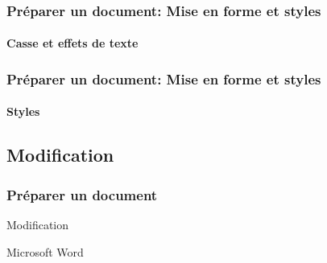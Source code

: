 \documentclass[xcolor=table]{beamer}
\begin{document}
\begin{frame}
\frametitle{Préparer un document: Mise en forme et styles}
\framesubtitle{Casse et effets de texte}

\begin{minipage}{0.58\textwidth}
\end{minipage}
\begin{minipage}{0.4\textwidth}
%
\end{minipage}

\end{frame}


\begin{frame}
\frametitle{Préparer un document: Mise en forme et styles}
\framesubtitle{Styles}

\begin{minipage}{0.58\textwidth}
\end{minipage}
\begin{minipage}{0.4\textwidth}
%
%
\end{minipage}

\end{frame}

\subsection{Modification}%

\begin{frame}
\frametitle{Préparer un document}

\begin{center}
	Modification 
	
	Microsoft Word
\end{center}

\end{frame}
\end{document}
